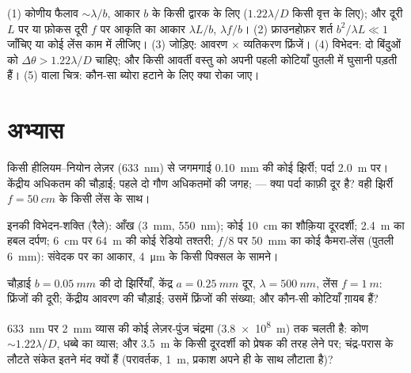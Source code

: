\begin{method}[विवर्तन के आकलन]\label{met:b2:diffraction:method}
(1) कोणीय फैलाव $\sim\lambda/b$, आकार $b$ के किसी द्वारक के लिए ($1.22\lambda/D$ किसी वृत्त के लिए);
और दूरी $L$ पर या फ़ोकस दूरी $f$ पर आकृति का आकार
$\lambda L/b$, $\lambda f/b$। (2) फ्राउनहोफ़र शर्त $b^2/\lambda L \ll 1$ जाँचिए या
कोई लेंस काम में लीजिए। (3) जोड़िए:  आवरण $\times$ व्यतिकरण
फ्रिंजें। (4) विभेदन: दो बिंदुओं को $\Delta\theta > 1.22\lambda/D$ चाहिए; और किसी आवर्ती
वस्तु को अपनी पहली कोटियाँ पुतली में घुसानी पड़ती हैं। (5)  वाला चित्र: कौन-सा ब्योरा हटाने के लिए क्या रोका जाए।
\end{method}

\section{अभ्यास}

\begin{exercise}[$\star$]\label{exo:b2:diffraction:1}
किसी हीलियम--नियोन लेज़र (\qty{633}{nm}) से जगमगाई \qty{0.10}{mm} की कोई झिर्री; पर्दा
\qty{2.0}{m} पर। केंद्रीय अधिकतम की चौड़ाई; पहले दो गौण अधिकतमों की
जगह;  --- क्या पर्दा काफ़ी दूर है? वही
झिर्री $f = \qty{50}{cm}$ के किसी लेंस के साथ।
\end{exercise}

\begin{exercise}[$\star$]\label{exo:b2:diffraction:2}
इनकी विभेदन-शक्ति (रैले): आँख (\qty{3}{mm}, \qty{550}{nm}); कोई
\qty{10}{cm} का शौक़िया दूरदर्शी; \qty{2.4}{m} का हबल दर्पण; \qty{6}{cm} पर \qty{64}{m}
की कोई रेडियो तश्तरी; $f/8$ पर \qty{50}{mm} का कोई कैमरा-लेंस (पुतली \qty{6}{mm}):
संवेदक पर  का आकार, \qty{4}{\micro m} के किसी पिक्सल के सामने।
\end{exercise}

\begin{exercise}[$\star$]\label{exo:b2:diffraction:3}
चौड़ाई $b = \qty{0.05}{mm}$ की दो झिर्रियाँ, केंद्र $a = \qty{0.25}{mm}$ दूर, $\lambda =
\qty{500}{nm}$, लेंस $f = \qty{1}{m}$: फ्रिंजों की दूरी; केंद्रीय आवरण की
चौड़ाई; उसमें फ्रिंजों की संख्या; और कौन-सी कोटियाँ ग़ायब हैं?
\end{exercise}

\begin{exercise}[$\star$]\label{exo:b2:diffraction:4}
\qty{633}{nm} पर \qty{2}{mm} व्यास की कोई लेज़र-पुंज चंद्रमा
(\qty{3.8e8}{m}) तक चलती है:  कोण $\sim1.22\lambda/D$, धब्बे का व्यास;
और \qty{3.5}{m} के किसी दूरदर्शी को प्रेषक की तरह लेने पर; चंद्र-परास के लौटते संकेत इतने
मंद क्यों हैं (परावर्तक, \qty{1}{m}, प्रकाश अपने ही  के साथ लौटाता है)?
\end{exercise}

